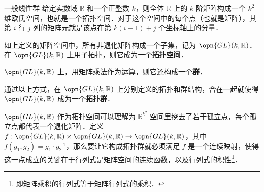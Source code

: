 \begin{example}{一般线性群}\label{TopGrp_ex2}
给定实数域 $\mathbb{R}$ 和一个正整数 $k$，则全体 $\mathbb{R}$ 上的 $k$ 阶矩阵构成一个 $k^2$ 维欧氏空间，也就是一个拓扑空间．对于这个空间中的每个点（也就是矩阵），其第 $i$ 行 $j$ 列的矩阵元就是该点在第 $k(i-1)+j$ 个坐标轴上的分量．

如上定义的矩阵空间中，所有非退化矩阵构成一个子集，记为 $\opn{GL}(k, \mathbb{R})$．在 $\opn{GL}(k,\mathbb{R})$ 上用子拓扑，则它成为一个\textbf{拓扑空间}．

$\opn{GL}(k,\mathbb{R})$ 上，用矩阵乘法作为运算，则它还构成一个\textbf{群}．

通过以上方式，在 $\opn{GL}(k, \mathbb{R})$ 上分别定义的拓扑和群结构，合在一起就使得 $\opn{GL}(k, \mathbb{R})$ 成为一个\textbf{拓扑群}．
\end{example}

$\opn{GL}(k, \mathbb{R})$ 作为拓扑空间可以理解为 $\mathbb{R}^{k^2}$ 空间里挖去了若干孤立点，每个孤立点都代表一个退化矩阵．定义 $f:\opn{GL}(k, \mathbb{R})\times\opn{GL}(k, \mathbb{R})\to\opn{GL}(k, \mathbb{R})$，其中 $f(g_1, g_2)=g_1\cdot g_2^{-1}$，那么要让它构成拓扑群就必须满足 $f$ 是一个连续映射，使得这一点成立的关键在于行列式是矩阵空间的连续函数，以及行列式的积性\footnote{即矩阵乘积的行列式等于矩阵行列式的乘积．}．








